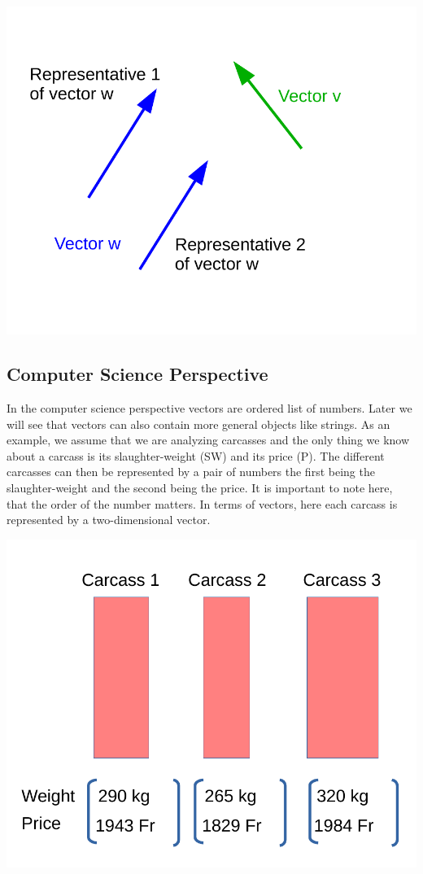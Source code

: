 \documentclass[
]{book}
\begin{document}
\includegraphics[width=12.22in,]{odg/vector-physics-perspective}

\hypertarget{intro-linalg-computer-science-perspective}{%
\subsection{Computer Science Perspective}\label{intro-linalg-computer-science-perspective}}

In the computer science perspective vectors are ordered list of numbers. Later we will see that vectors can also contain more general objects like strings. As an example, we assume that we are analyzing carcasses and the only thing we know about a carcass is its slaughter-weight (SW) and its price (P). The different carcasses can then be represented by a pair of numbers the first being the slaughter-weight and the second being the price. It is important to note here, that the order of the number matters. In terms of vectors, here each carcass is represented by a two-dimensional vector.

\includegraphics[width=7.54in,]{odg/vector-cs-perspecitve}
\end{document}
